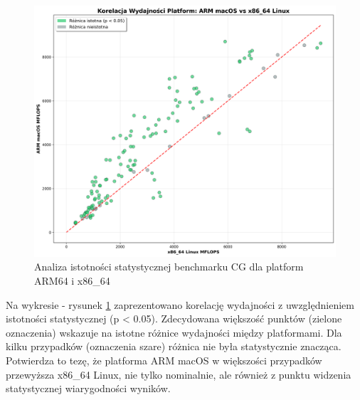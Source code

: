 \begin{figure}[H]
    \centering
    \includegraphics[width=\textwidth]{analiza/images/parallel/cg/compare/cg_analiza_istotnosci_statystycznej.png}
    \caption{Analiza istotności statystycznej benchmarku CG dla platform ARM64 i x86\_64}
    \label{cg_analiza_istotnosci_statystycznej}
\end{figure}
Na wykresie - rysunek \ref{cg_analiza_istotnosci_statystycznej} zaprezentowano korelację wydajności z uwzględnieniem istotności statystycznej (p < 0.05). Zdecydowana większość punktów (zielone oznaczenia) wskazuje na istotne różnice wydajności między platformami. Dla kilku przypadków (oznaczenia szare) różnica nie była statystycznie znacząca. Potwierdza to tezę, że platforma ARM macOS w większości przypadków przewyższa x86\_64 Linux, nie tylko nominalnie, ale również z punktu widzenia statystycznej wiarygodności wyników.